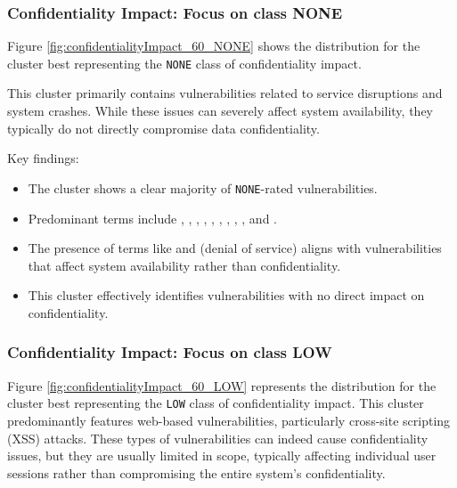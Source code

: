 \documentclass[12pt]{article}
\begin{document}
\subsubsection{Confidentiality Impact: Focus on class NONE}

Figure \ref{fig:confidentialityImpact_60_NONE} shows the distribution for the cluster best
representing the \texttt{NONE} class of confidentiality impact.

This cluster primarily contains vulnerabilities related to service disruptions and system crashes.
While these issues can severely affect system availability, they typically do not directly
compromise data confidentiality.

Key findings:

\begin{itemize}

	\item The cluster shows a clear majority of \texttt{NONE}-rated vulnerabilities.

	\item Predominant terms include , , , ,
	      , , , , , and .

	\item The presence of terms like  and  (denial of service) aligns with
	      vulnerabilities that affect system availability rather than confidentiality.

	\item This cluster effectively identifies vulnerabilities with no direct impact on
	      confidentiality.

\end{itemize}

\subsubsection{Confidentiality Impact: Focus on class LOW}

Figure \ref{fig:confidentialityImpact_60_LOW} represents the distribution for the cluster best
representing the \texttt{LOW} class of confidentiality impact. This cluster predominantly
features web-based vulnerabilities, particularly cross-site scripting (XSS) attacks. These types of
vulnerabilities can indeed cause confidentiality issues, but they are usually limited in scope,
typically affecting individual user sessions rather than compromising the entire system's
confidentiality.
\end{document}
